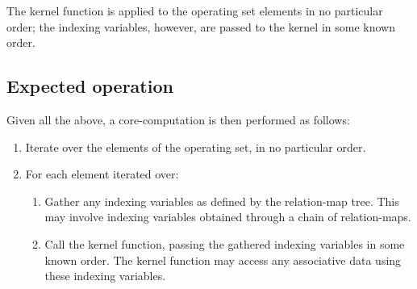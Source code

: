 The kernel function is applied to the operating set elements in no particular order; the indexing variables, however, are passed to the kernel in some known order.


\subsection{Expected operation}
Given all the above, a core-computation is then performed as follows:
\begin{enumerate}
\item Iterate over the elements of the operating set, in no particular order.
\item For each element iterated over:
    \begin{enumerate}
    \item Gather any indexing variables as defined by the relation-map tree. This may involve indexing variables obtained through a chain of relation-maps.
    \item Call the kernel function, passing the gathered indexing variables in some known order. The kernel function may access any associative data using these indexing variables.
    \end{enumerate}
\end{enumerate}
